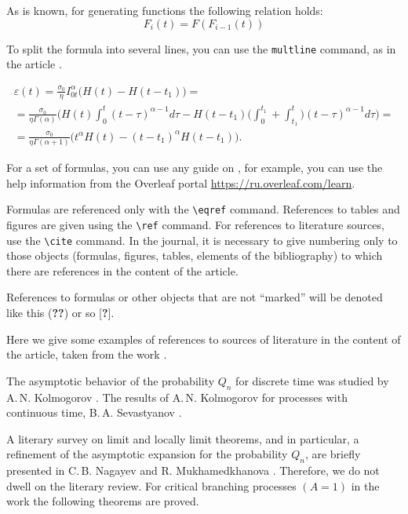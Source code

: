\documentclass{mfitjournal-en}%
\begin{document}
As is known, for generating functions the following relation holds: 
\begin{equation}  
F_{i} \left(t\right)=F(F_{i-1}\left(t\right))  
\label{eq1}  
\end{equation}   

To split the formula into several lines, you can use the {\tt multline} command, as in the article \cite{Ung16}.

\begin{multline}\label{eq2}
\varepsilon(t)=\frac{\sigma_{0}}{\eta}I_{0t}^{\alpha} \bigl( H(t)-H(t-t_{1})\bigr)
= 
\\
=\frac{\sigma_{0}}{\eta\Gamma(\alpha)} \biggl(H(t)\int _{0}^{t}(t-\tau)^{\alpha-1}d\tau
-H(t-t_{1}) \biggl(\int _{0}^{t_{1}}+\int _{t_{1}}^{t} \biggr)(t-\tau)^{\alpha-1}d\tau \biggr)=
\\
= \frac{\sigma_{0}}{\eta \Gamma (\alpha+1)} \bigl(t^{\alpha}H(t)-(t-t_{1})^{\alpha}H(t-t_{1})\bigr).
\end{multline}                         				

For a set of formulas, you can use any guide on \LaTeXe, for example, you can use the help information from the Overleaf portal \href{https://ru.overleaf.com/learn}{https://ru.overleaf.com/learn}.

Formulas are referenced only with the \verb "\eqref" command. References to tables and figures are given using the \verb "\ref" command. For references to literature sources, use the \verb "\cite" command. In the journal, it is necessary to give numbering only to those objects (formulas, figures, tables, elements of the bibliography) to which there are references in the content of the article.

References to formulas or other objects that are not “marked” will be denoted like this ({\bf ??}) or so [{\bf?}].

Here we give some examples of references to sources of literature in the content of the article, taken from the work \cite{Jur20}.

The asymptotic behavior of the probability $ Q_ {n} $ for discrete time was studied by A.\,N. Kolmogorov \cite{Kol}. The results of A.\,N. Kolmogorov for processes with continuous time, B.\,A. Sevastyanov \cite{Sev}.

A literary survey on limit and locally limit theorems, and in particular, a refinement of the asymptotic expansion for the probability $ Q_ {n} $, are briefly presented in C.\,B. Nagayev and R. Mukhamedkhanova \cite{Nag}. Therefore, we do not dwell on the literary review. For critical branching processes $\left(A = 1 \right) $ in the work \cite[pp. 96-97]{Nag} the following theorems are proved.
\end{document}
